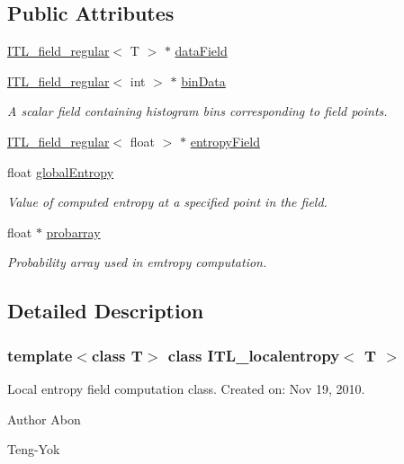 \subsection*{Public Attributes}
\begin{DoxyCompactItemize}
\item 
\hyperlink{classITL__field__regular}{ITL\_\-field\_\-regular}$<$ T $>$ $\ast$ \hyperlink{classITL__localentropy_aac95adfde1b819d6ef14426515ec4183}{dataField}
\item 
\hyperlink{classITL__field__regular}{ITL\_\-field\_\-regular}$<$ int $>$ $\ast$ \hyperlink{classITL__localentropy_a89630418121dbe6869cdea704e7d33f3}{binData}
\begin{DoxyCompactList}\small\item\em A scalar field containing histogram bins corresponding to field points. \item\end{DoxyCompactList}\item 
\hyperlink{classITL__field__regular}{ITL\_\-field\_\-regular}$<$ float $>$ $\ast$ \hyperlink{classITL__localentropy_aab1116212e70c828f868d5d916e710fd}{entropyField}
\item 
float \hyperlink{classITL__localentropy_a348b84e62aeb0982501bd586798432e3}{globalEntropy}
\begin{DoxyCompactList}\small\item\em Value of computed entropy at a specified point in the field. \item\end{DoxyCompactList}\item 
float $\ast$ \hyperlink{classITL__localentropy_ad5bf31b2310bf48330ac4b43f2f3c76b}{probarray}
\begin{DoxyCompactList}\small\item\em Probability array used in emtropy computation. \item\end{DoxyCompactList}\end{DoxyCompactItemize}


\subsection{Detailed Description}
\subsubsection*{template$<$class T$>$ class ITL\_\-localentropy$<$ T $>$}

Local entropy field computation class. Created on: Nov 19, 2010. \begin{DoxyAuthor}{Author}
Abon 

Teng-\/Yok 
\end{DoxyAuthor}


